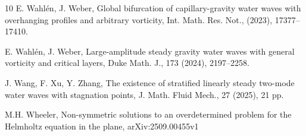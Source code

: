 \documentclass[reqno]{amsart}
\numberwithin{equation}{section}
\numberwithin{equation}{section}
\numberwithin{equation}{section}
\begin{document}
\begin{thebibliography}{10}
 E. Wahl\'{e}n, J. Weber, Global bifurcation of capillary-gravity water waves with overhanging profiles and arbitrary vorticity, Int. Math. Res. Not., (2023), 17377--17410.

 E. Wahl\'{e}n, J. Weber, Large-amplitude steady gravity water waves with general vorticity and critical layers, Duke Math. J., 173 (2024), 2197--2258.

 J. Wang, F. Xu, Y. Zhang, The existence of stratified linearly steady two-mode water waves with stagnation points,
J. Math. Fluid Mech., 27 (2025), 21 pp.

 M.H. Wheeler, Non-symmetric solutions to an overdetermined problem for the Helmholtz equation in the plane, arXiv:2509.00455v1







\end{thebibliography}
\end{document}
